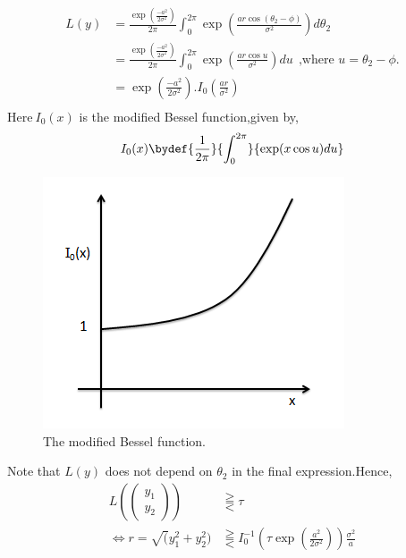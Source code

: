 \documentclass[12pt]{report}
\begin{document}
\begin{exmp}
\begin{align*}
L(y)&= {\frac{\exp(\frac{-a^2}{2\sigma^2})}{2\pi}}{\int_{0}^{2\pi}} {\exp({\frac{ar\cos(\theta_2-\phi)}{\sigma^2}})d\theta_2}\\        
      &= {\frac{\exp(\frac{-a^2}{2\sigma^2})}{2\pi}}{\int_{0}^{2\pi}} {\exp({\frac{ar\cos{u}}{\sigma^2}})du}~~\text{,where $u=\theta_2-\phi$.}\\
      &= {\exp({\frac{-a^2}{2\sigma^2}})}.I_0({\frac{ar}{\sigma^2}})\\
\end{align*}
Here$\ I_0{(x)}$ is the modified Bessel function,given by,\\
\begin{align*}
I_0(x) \bydef {\frac{1}{2\pi}} {\int_{0}^{2\pi}} {\exp(x\cos{u})du}\\
\end{align*}
\begin{figure}[h]
\centering
\includegraphics[scale=0.8]{Figures/modifiedbessel.png}
\caption{The modified Bessel function.}
\label{fig:modbessl}
\end{figure}
Note that $L(y)$ does not depend on $\theta_2$ in the final expression.Hence,
\begin{align*}
L(\left(\begin{smallmatrix}y_1 \\ y_2\end{smallmatrix}\right)) &\gtreqqless \tau \\ 
\Leftrightarrow r=\sqrt(y_1^2+y_2^2)  &\gtreqqless I_0^{-1}(\tau \exp(\frac{a^2}{2\sigma^2})) {\frac{\sigma^2}{a}} \\
\end{align*}
\end{exmp}
\end{document}
